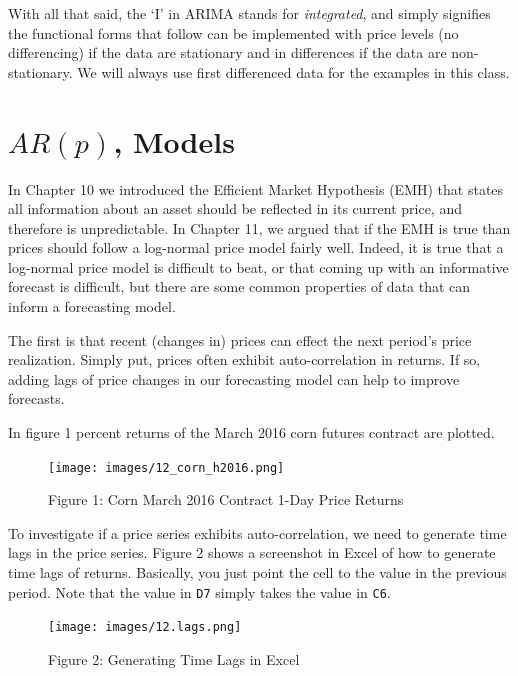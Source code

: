\documentclass[
  letterpaper,
  DIV=11,
  numbers=noendperiod]{scrreprt}
\begin{document}
With all that said, the `I' in ARIMA stands for \emph{integrated}, and
simply signifies the functional forms that follow can be implemented
with price levels (no differencing) if the data are stationary and in
differences if the data are non-stationary. We will always use first
differenced data for the examples in this class.

\hypertarget{arp-models}{%
\section{\texorpdfstring{\(AR(p)\),
Models}{AR(p), Models}}\label{arp-models}}

In Chapter 10 we introduced the Efficient Market Hypothesis (EMH) that
states all information about an asset should be reflected in its current
price, and therefore is unpredictable. In Chapter 11, we argued that if
the EMH is true than prices should follow a log-normal price model
fairly well. Indeed, it is true that a log-normal price model is
difficult to beat, or that coming up with an informative forecast is
difficult, but there are some common properties of data that can inform
a forecasting model.

The first is that recent (changes in) prices can effect the next
period's price realization. Simply put, prices often exhibit
auto-correlation in returns. If so, adding lags of price changes in our
forecasting model can help to improve forecasts.

In figure 1 percent returns of the March 2016 corn futures contract are
plotted.

\begin{figure}

{\centering \texttt{[image: images/12\_corn\_h2016.png]}

}

\caption{Figure 1: Corn March 2016 Contract 1-Day Price Returns}

\end{figure}

To investigate if a price series exhibits auto-correlation, we need to
generate time lags in the price series. Figure 2 shows a screenshot in
Excel of how to generate time lags of returns. Basically, you just point
the cell to the value in the previous period. Note that the value in
\texttt{D7} simply takes the value in \texttt{C6}.

\begin{figure}

{\centering \texttt{[image: images/12.lags.png]}

}

\caption{Figure 2: Generating Time Lags in Excel}

\end{figure}
\end{document}
